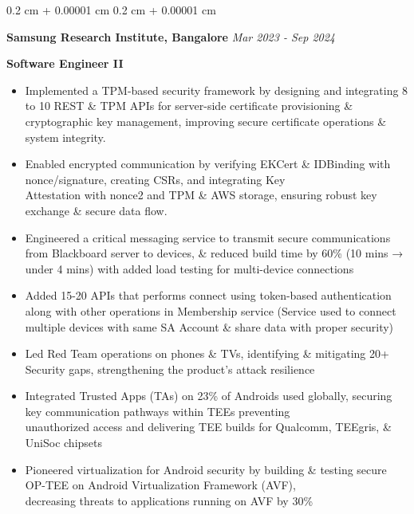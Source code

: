 \documentclass[10pt, letterpaper]{article}
\newenvironment{highlights}{
    \begin{itemize}[
        topsep=0.10 cm,
        parsep=0.10 cm,
        partopsep=0pt,
        itemsep=0pt,
        leftmargin=0.4 cm
    ]
}{
    \end{itemize}
} %
\newenvironment{onecolentry}{
    \begin{adjustwidth}{
        0.2 cm + 0.00001 cm
    }{
        0.2 cm + 0.00001 cm
    }
}{
    \end{adjustwidth}
} %
\begin{document}
        \begin{onecolentry}
        \fontsize{11 pt}{11 pt}
        \textbf{Samsung Research Institute, Bangalore} \hfill \textit{Mar 2023 - Sep 2024}

            \fontsize{11 pt}{11 pt}
            \textbf{Software Engineer II}
            \begin{highlights}
                \item	Implemented a TPM-based security framework by designing and integrating 8 to 10 REST \& TPM APIs for server-side certificate provisioning \& cryptographic key management, improving secure certificate operations \& system integrity.
                \item	Enabled encrypted communication by verifying EKCert \& IDBinding with nonce/signature, creating CSRs, and integrating Key \\ Attestation with nonce2 and TPM \& AWS storage, ensuring robust key exchange \& secure data flow.
                \item	Engineered a critical messaging service to transmit secure communications from Blackboard server to devices, \& reduced build time by 60\% (10 mins → under 4 mins) with added load testing for multi-device connections
                \item	Added 15-20 APIs that performs connect using token-based authentication along with other operations in Membership service (Service used to connect multiple devices with same SA Account \& share data with proper security)
                
                \item	Led Red Team operations on phones \& TVs, identifying \& mitigating 20+ Security gaps, strengthening the product's attack resilience
                
                \item	Integrated Trusted Apps (TAs) on 23\% of Androids used globally, securing key communication pathways within TEEs preventing \\ unauthorized access and delivering TEE builds for Qualcomm, TEEgris, \& UniSoc chipsets
                
                \item Pioneered virtualization for Android security by building \& testing secure OP-TEE on Android Virtualization Framework (AVF), \\ decreasing threats to applications running on AVF by 30\%


            \end{highlights}
        \end{onecolentry}
\end{document}
